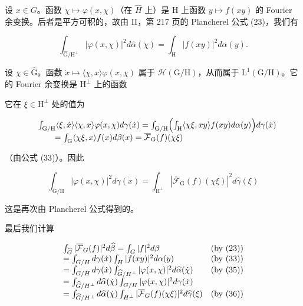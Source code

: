 设 \(x \in G\)。函数 \(\dot{\chi} \mapsto \varphi(x, \chi)\)（在 \(\hat{H}\) 上）是 H 上函数 \(y \mapsto f(xy)\) 的 Fourier 余变换。后者是平方可积的，故由 II，第 217 页的 Plancherel 公式 (23)，我们有

\[
\int_ {\widehat {\mathrm{G}} / \mathrm{H} ^ {\perp}} | \varphi (x, \chi) | ^ {2} d \widehat {\alpha} (\dot {\chi}) = \int_ {\mathrm{H}} | f (x y) | ^ {2} d \alpha (y).\tag{35}
\]

 设 \(\chi\in\widehat{\mathrm{G}}\)。函数 \(\dot{x}\mapsto\langle\chi,x\rangle\varphi(x,\chi)\) 属于 \(\mathcal{H}(\mathrm{G}/\mathrm{H})\)，从而属于 \(\mathrm{L}^{1}(\mathrm{G}/\mathrm{H})\)。它的 Fourier 余变换是 \(\mathrm{H}^{\perp}\) 上的函数

它在 \(\xi\in\mathrm{H}^{\perp}\) 处的值为

\[
\begin{array}{r l} & {\int_ {\mathrm{G/H}} \langle \xi , \dot {x} \rangle \langle \chi , x \rangle \varphi (x, \chi) d \gamma (\dot {x}) = \int_ {\mathrm{G/H}} \Bigl (\int_ {\mathrm{H}} \langle \chi \xi , x y \rangle f (x y) d \alpha (y) \Bigr) d \gamma (\dot {x})} \\ & {\qquad = \int_ {\mathrm{G}} \langle \chi \xi , x \rangle f (x) d \beta (x) = \overline {{\mathcal {F}}} _ {\mathrm{G}} (f) (\chi \xi)} \end{array}
\]

（由公式 (33)）。因此

\[
\int_ {\mathrm{G/H}} | \varphi (x, \chi) | ^ {2} d \gamma (\dot {x}) = \int_ {\mathrm{H} ^ {\perp}} | \overline {{\mathcal {F}}} _ {\mathrm{G}} (f) (\chi \xi) | ^ {2} d \widehat {\gamma} (\xi)\tag{36}
\]

这是再次由 Plancherel 公式得到的。

最后我们计算

\[
\begin{array}{l l} \int_ {\widehat {G}} | \overline {{\mathcal {F}}} _ {G} (f) | ^ {2} d \widehat {\beta} = \int_ {G} | f | ^ {2} d \beta & (\text {by (23)}) \\ = \int_ {G / H} d \gamma (\dot {x}) \int_ {H} | f (x y) | ^ {2} d \alpha (y) & (\text {by (33)}) \\ = \int_ {G / H} d \gamma (\dot {x}) \int_ {\widehat {G} / H ^ {\perp}} | \varphi (x, \chi) | ^ {2} d \widehat {\alpha} (\dot {\chi}) & (\text {by (35)}) \\ = \int_ {\widehat {G} / H ^ {\perp}} d \widehat {\alpha} (\dot {\chi}) \int_ {G / H} | \varphi (x, \chi) | ^ {2} d \gamma (\dot {x}) \\ = \int_ {\widehat {G} / H ^ {\perp}} d \widehat {\alpha} (\dot {\chi}) \int_ {H ^ {\perp}} | \overline {{\mathcal {F}}} _ {G} (f) (\chi \xi) | ^ {2} d \widehat {\gamma} (\xi) & (\text {by (36)}) \end{array}
\]

